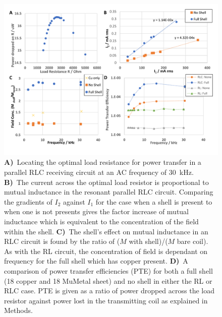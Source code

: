 \documentclass[11pt]{iopart}
\begin{document}
\begin{figure}
  \begin{center}
   \noindent\includegraphics[width=\linewidth]{images/compoundRLC.pdf}
  \end{center}
  \caption{
    \textbf{A)}~Locating the optimal load resistance for power transfer in a
    parallel RLC receiving circuit at an AC frequency of $30$~kHz.
    \textbf{B)}~The current across the optimal load resistor is proportional to
    mutual inductance in the resonant parallel RLC circuit. Comparing
    the gradients of $I_2$ against $I_1$ for the case when a shell is
    present to when one is not presents gives the factor increase of
    mutual inductance which is equivalent to the concentration of the
    field within the shell.  
    \textbf{C)}~The shell's effect on mutual inductance in an RLC circuit is
    found by the ratio of ($M$ with shell)/($M$ bare coil). As with
    the RL circuit, the concentration of field is dependant on
    frequency for the full shell which has copper present.
    \textbf{D)}~A comparison of power transfer efficiencies (PTE) for both a
    full shell (18 copper and 18 MuMetal sheet) and no shell in either
    the RL or RLC case. PTE is given as a ratio of power dropped
    across the load resistor against power lost in the transmitting
    coil as explained in Methods.
  }
  \label{fig:cpdRLC}
\end{figure}
\end{document}
